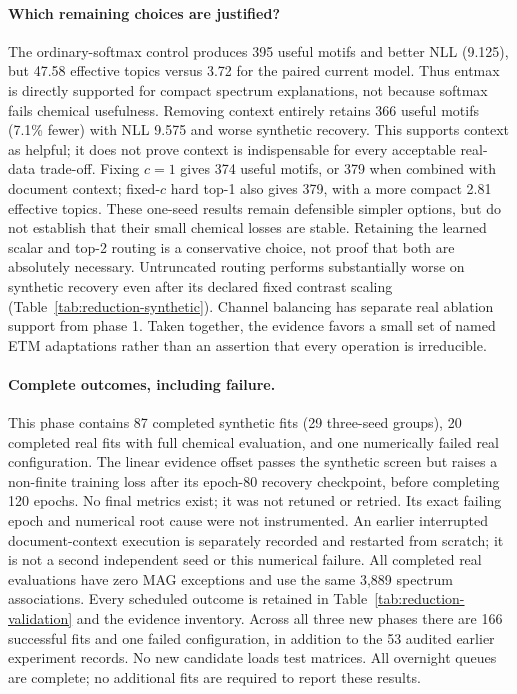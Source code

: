 \documentclass[10pt,a4paper]{article}
\begin{document}
\paragraph{Which remaining choices are justified?}
The ordinary-softmax control produces 395 useful motifs and better NLL (9.125),
but 47.58 effective topics versus 3.72 for the paired current model.
Thus entmax is directly supported for compact spectrum explanations, not
because softmax fails chemical usefulness. Removing context entirely retains
366 useful motifs (7.1\% fewer) with NLL 9.575 and worse synthetic recovery.
This supports context as helpful; it does not prove context is indispensable
for every acceptable real-data trade-off.
Fixing $c=1$ gives 374 useful motifs, or 379 when combined with document context;
fixed-$c$ hard top-1 also gives 379, with a more compact 2.81 effective topics.
These one-seed results remain defensible simpler options, but do not establish
that their small chemical losses are stable. Retaining the learned scalar and
top-2 routing is a conservative choice, not proof that both are absolutely
necessary. Untruncated routing performs substantially worse on synthetic
recovery even after its declared fixed contrast scaling
(Table~\ref{tab:reduction-synthetic}). Channel balancing has separate real
ablation support from phase 1. Taken together, the evidence favors a small
set of named ETM adaptations rather than an assertion that every operation is
irreducible.

\paragraph{Complete outcomes, including failure.}
This phase contains 87 completed synthetic fits (29 three-seed groups), 20
completed real fits with full chemical evaluation, and one numerically failed
real configuration. The linear evidence offset passes the synthetic screen
but raises a non-finite training loss after its epoch-80 recovery checkpoint,
before completing 120 epochs. No final metrics exist; it was not retuned or
retried. Its exact failing epoch and numerical root cause were not instrumented.
An earlier interrupted document-context execution is separately recorded and
restarted from scratch; it is not a second independent seed or this numerical
failure. All completed real evaluations have zero MAG exceptions and use the
same 3,889 spectrum associations. Every scheduled outcome is retained in
Table~\ref{tab:reduction-validation} and the evidence inventory.
Across all three new phases there are 166 successful fits and one failed
configuration, in addition to the 53 audited earlier experiment records.
No new candidate loads test matrices. All overnight queues are complete;
no additional fits are required to report these results.
\end{document}

